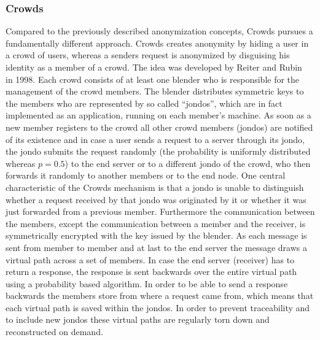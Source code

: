 \documentclass{sig-alternate}
\begin{document}
\subsubsection {Crowds}
Compared to the previously described anonymization concepts, Crowds pursues a fundamentally different approach. Crowds creates anonymity by hiding a user in a crowd of users, whereas a senders request is anonymized by disguising his identity as a member of a crowd. The idea was developed by Reiter and Rubin~\cite{reiter1998crowds} in 1998. Each crowd consists of at least one blender who is responsible for the management of the crowd members. The blender distributes symmetric keys to the members who are represented by so called ``jondos'', which are in fact implemented as an application, running on each member's machine. As soon as a new member registers to the crowd all other crowd members (jondos) are notified of its existence and in case a user sends a request to a server through its jondo, the jondo submits the request randomly (the probability is uniformly distributed whereas $p = 0.5$) to the end server or to a different jondo of the crowd, who then forwards it randomly to another members or to the end node. One central characteristic of the Crowds mechanism is that a jondo is unable to distinguish whether a request received by that jondo was originated by it or whether it was just forwarded from a previous member. Furthermore the communication between the members, except the communication between a member and the receiver, is symmetrically encrypted with the key issued by the blender. As each message is sent from member to member and at last to the end server the message draws a virtual path across a set of members. In case the end server (receiver) has to return a response, the response is sent backwards over the entire virtual path using a probability based algorithm. In order to be able to send a response backwards the members store from where a request came from, which means that each virtual path is saved within the jondos. In order to prevent traceability and to include new jondos these virtual paths are regularly torn down and reconstructed on demand. 
\end{document}
